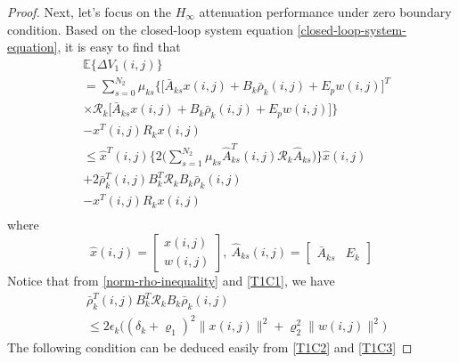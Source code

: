 \documentclass[conference]{IEEEtran}
\begin{document}
\begin{proof}
	Next, let's focus on the $H_{\infty}$ attenuation performance under zero boundary condition. Based on the closed-loop system equation \eqref{closed-loop-system-equation}, it is easy to find that
	\begin{equation}\label{DETAV1}
	\begin{split}
	&\mathbb{E}\{\varDelta V_{1}(i,j) \}\\
	&=  \sum_{s=0}^{N_{2}}\mu_{ks}\Big\{\big[\bar{A}_{ks}x(i,j)+B_{k}\bar{\rho}_{k}(i,j)+E_{p}w(i,j)\big]^{T}\\
	&\times \mathcal{R}_{k}\big[\bar{A}_{ks}x(i,j)+B_{k}\bar{\rho}_{k}(i,j)+E_{p}w(i,j)\big]\Big\}\\
	&- x^{T}(i,j)R_{k}x(i,j) \\
	&\leq \hat{x}^{T}(i,j) \Big\{2\big(\sum_{s=1}^{N_{2}}\mu_{ks}\hat{A}^{T}_{ks}(i,j)\mathcal{R}_{k}\hat{A}_{ks}\big)\Big\}\hat{x}(i,j)\\ &+2\bar{\rho}^{T}_{k}(i,j)B^{T}_{k}\mathcal{R}_{k}B_{k}\bar{\rho}_{k}(i,j) \\
	&-  x^{T}(i,j)R_{k}x(i,j)\\
	\end{split}
	\end{equation}
	where
	\begin{equation*}
		\hat{x}(i,j)=\begin{bmatrix}
		x(i,j)\\ w(i,j)
		\end{bmatrix},\ \hat{A}_{ks}(i,j)=\begin{bmatrix}
		\bar{A}_{ks}&E_{k}
		\end{bmatrix}
	\end{equation*}
	Notice that from \eqref{norm-rho-inequality} and \eqref{T1C1}, we have
	\begin{equation}\label{invRho}
		\begin{split}
		 	&\bar{\rho}^{T}_{k}(i,j)B^{T}_{k}\mathcal{R}_{k}B_{k}\bar{\rho}_{k}(i,j)\\
		 	&\leq 2\epsilon_{k}\big((\delta_{k}+\varrho_{1})^{2}\|x(i,j)\|^{2}+\varrho_{2}^{2}\|w(i,j)\|^{2} \big)
		\end{split}
	\end{equation} 
	The following condition can be deduced easily from \eqref{T1C2} and \eqref{T1C3}

\end{proof}
\end{document}
